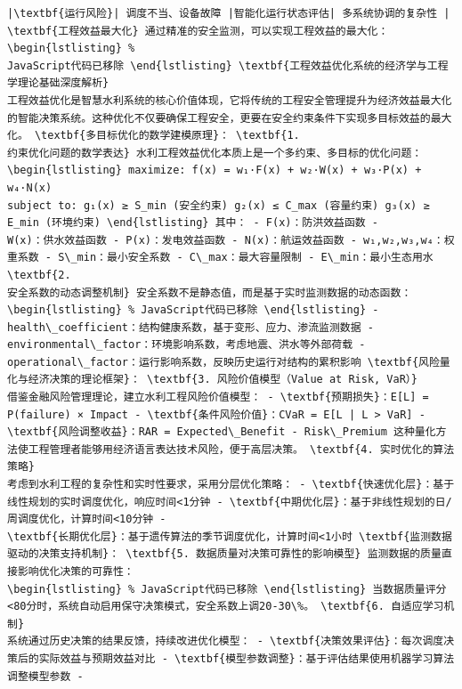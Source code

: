 \begin{verbatim}
|\textbf{运行风险}| 调度不当、设备故障 |智能化运行状态评估| 多系统协调的复杂性 | \textbf{工程效益最大化} 通过精准的安全监测，可以实现工程效益的最大化： \begin{lstlisting} %
JavaScript代码已移除 \end{lstlisting} \textbf{工程效益优化系统的经济学与工程学理论基础深度解析}
工程效益优化是智慧水利系统的核心价值体现，它将传统的工程安全管理提升为经济效益最大化的智能决策系统。这种优化不仅要确保工程安全，更要在安全约束条件下实现多目标效益的最大化。 \textbf{多目标优化的数学建模原理}： \textbf{1.
约束优化问题的数学表达} 水利工程效益优化本质上是一个多约束、多目标的优化问题： \begin{lstlisting} maximize: f(x) = w₁·F(x) + w₂·W(x) + w₃·P(x) + w₄·N(x)
subject to: g₁(x) ≥ S_min (安全约束) g₂(x) ≤ C_max (容量约束) g₃(x) ≥ E_min (环境约束) \end{lstlisting} 其中： - F(x)：防洪效益函数 -
W(x)：供水效益函数 - P(x)：发电效益函数 - N(x)：航运效益函数 - w₁,w₂,w₃,w₄：权重系数 - S\_min：最小安全系数 - C\_max：最大容量限制 - E\_min：最小生态用水 \textbf{2.
安全系数的动态调整机制} 安全系数不是静态值，而是基于实时监测数据的动态函数： \begin{lstlisting} % JavaScript代码已移除 \end{lstlisting} -
health\_coefficient：结构健康系数，基于变形、应力、渗流监测数据 - environmental\_factor：环境影响系数，考虑地震、洪水等外部荷载 -
operational\_factor：运行影响系数，反映历史运行对结构的累积影响 \textbf{风险量化与经济决策的理论框架}： \textbf{3. 风险价值模型（Value at Risk, VaR）}
借鉴金融风险管理理论，建立水利工程风险价值模型： - \textbf{预期损失}：E[L] = P(failure) × Impact - \textbf{条件风险价值}：CVaR = E[L | L > VaR] -
\textbf{风险调整收益}：RAR = Expected\_Benefit - Risk\_Premium 这种量化方法使工程管理者能够用经济语言表达技术风险，便于高层决策。 \textbf{4. 实时优化的算法策略}
考虑到水利工程的复杂性和实时性要求，采用分层优化策略： - \textbf{快速优化层}：基于线性规划的实时调度优化，响应时间<1分钟 - \textbf{中期优化层}：基于非线性规划的日/周调度优化，计算时间<10分钟 -
\textbf{长期优化层}：基于遗传算法的季节调度优化，计算时间<1小时 \textbf{监测数据驱动的决策支持机制}： \textbf{5. 数据质量对决策可靠性的影响模型} 监测数据的质量直接影响优化决策的可靠性：
\begin{lstlisting} % JavaScript代码已移除 \end{lstlisting} 当数据质量评分<80分时，系统自动启用保守决策模式，安全系数上调20-30\%。 \textbf{6. 自适应学习机制}
系统通过历史决策的结果反馈，持续改进优化模型： - \textbf{决策效果评估}：每次调度决策后的实际效益与预期效益对比 - \textbf{模型参数调整}：基于评估结果使用机器学习算法调整模型参数 -

\end{verbatim}
